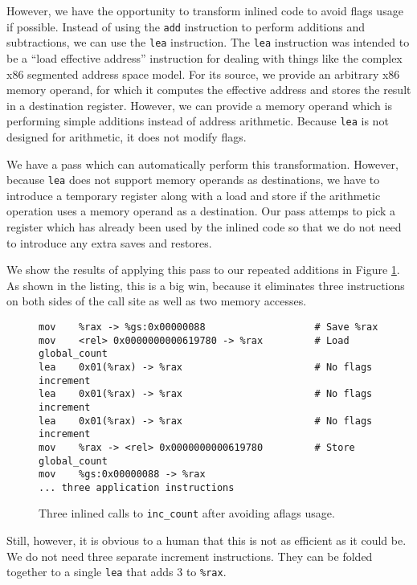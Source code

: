 However, we have the opportunity to transform inlined code to avoid flags usage
if possible.  Instead of using the {\tt add} instruction to perform additions
and subtractions, we can use the {\tt lea} instruction.  The {\tt lea}
instruction was intended to be a ``load effective address'' instruction for
dealing with things like the complex x86 segmented address space model.  For its
source, we provide an arbitrary x86 memory operand, for which it computes the
effective address and stores the result in a destination register.  However, we
can provide a memory operand which is performing simple additions instead of
address arithmetic.  Because {\tt lea} is not designed for arithmetic, it does
not modify flags.

We have a pass which can automatically perform this transformation.  However,
because {\tt lea} does not support memory operands as destinations, we have to
introduce a temporary register along with a load and store if the arithmetic
operation uses a memory operand as a destination.  Our pass attemps to pick a
register which has already been used by the inlined code so that we do not need
to introduce any extra saves and restores.

We show the results of applying this pass to our repeated additions in Figure
\ref{fig:inscount_flags}.  As shown in the listing, this is a big win, because
it eliminates three instructions on both sides of the call site as well as two
memory accesses.

\begin{figure}
\begin{verbatim}
mov    %rax -> %gs:0x00000088                   # Save %rax
mov    <rel> 0x0000000000619780 -> %rax         # Load global_count
lea    0x01(%rax) -> %rax                       # No flags increment
lea    0x01(%rax) -> %rax                       # No flags increment
lea    0x01(%rax) -> %rax                       # No flags increment
mov    %rax -> <rel> 0x0000000000619780         # Store global_count
mov    %gs:0x00000088 -> %rax 
... three application instructions
\end{verbatim}
\caption{Three inlined calls to {\tt inc\_count} after avoiding aflags usage.}
\label{fig:inscount_flags}
\end{figure}

Still, however, it is obvious to a human that this is not as efficient as it
could be.  We do not need three separate increment instructions.  They can be
folded together to a single {\tt lea} that adds 3 to {\tt \%rax}.

